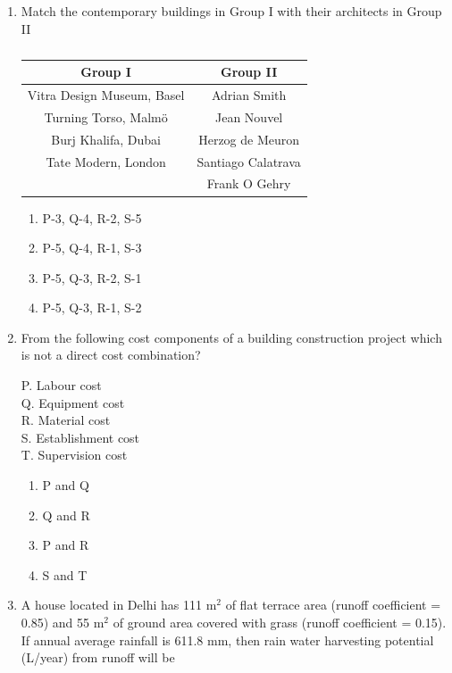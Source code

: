 \documentclass[journal,12pt,onecolumn]{IEEEtran}
\theoremstyle{remark}
\begin{document}
\begin{enumerate}
\item Match the contemporary buildings in Group I with their architects in Group II

\begin{table}[H]
\centering
\begin{tabular}{c|c}
Group I & Group II \\
\hline
Vitra Design Museum, Basel & Adrian Smith \\
Turning Torso, Malmö & Jean Nouvel \\
Burj Khalifa, Dubai & Herzog de Meuron \\
Tate Modern, London & Santiago Calatrava \\
 & Frank O Gehry \\
\end{tabular}
\caption*{}
\label{tab:Q.32}
\end{table}

\hfill{}
\begin{enumerate}
\item P-3, Q-4, R-2, S-5
\item P-5, Q-4, R-1, S-3
\item P-5, Q-3, R-2, S-1
\item P-5, Q-3, R-1, S-2
\end{enumerate}

\item From the following cost components of a building construction project which is not a direct cost combination?

P. Labour cost \\
Q. Equipment cost \\
R. Material cost \\
S. Establishment cost \\
T. Supervision cost

\hfill{}
\begin{enumerate}
\item P and Q
\item Q and R
\item P and R
\item S and T
\end{enumerate}

\item A house located in Delhi has 111 m$^2$ of flat terrace area (runoff coefficient = 0.85) and 55 m$^2$ of ground area covered with grass (runoff coefficient = 0.15). If annual average rainfall is 611.8 mm, then rain water harvesting potential (L/year) from runoff will be \underline{\hspace{2cm}}


\end{enumerate}
\end{document}
